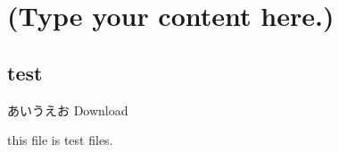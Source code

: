 \documentclass{jsbook}
\begin{document}
\chapter{(Type your content here.)}
\section{test}

あいうえお
Download 

this file is test files.
\end{document}
